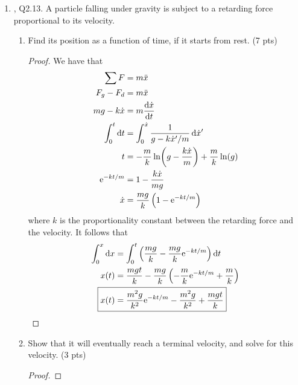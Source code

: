 \documentclass[../psets.tex]{subfiles}
\begin{document}
\begin{enumerate}
\begin{enumerate}
\begin{proof}
            \begin{align*}
                \Aboxed{x_{-a/\mu_1}(t) &= \delta x\cos(t\sqrt{\frac{2E(a\mu_2+b\mu_1)^2}{m}})-\frac{a}{\mu_1}}&
                \Aboxed{x_{b/\mu_2} &= \delta x\cos(t\sqrt{\frac{2E(a\mu_2+b\mu_1)^2}{m}})+\frac{b}{\mu_2}}
            \end{align*}
        \end{proof}
    \end{enumerate}
    \item \textcite{bib:KibbleBerkshire}, Q2.13. A particle falling under gravity is subject to a retarding force proportional to its velocity.
    \begin{enumerate}
        \item Find its position as a function of time, if it starts from rest. (7 pts)
        \begin{proof}
            We have that
            \begin{align*}
                \sum F &= m\ddot{x}\\
                F_g-F_d &= m\ddot{x}\\
                mg-k\dot{x} &= m\dv{\dot{x}}{t}\\
                \int_0^t\dd{t} &= \int_0^{\dot{x}}\frac{1}{g-k\dot{x}'/m}\dd{\dot{x}'}\\
                t &= -\frac{m}{k}\ln(g-\frac{k\dot{x}}{m})+\frac{m}{k}\ln(g)\\
                \e[-kt/m] &= 1-\frac{k\dot{x}}{mg}\\
                \dot{x} &= \frac{mg}{k}\left( 1-\e[-kt/m] \right)
            \end{align*}
            where $k$ is the proportionality constant between the retarding force and the velocity. It follows that
            \begin{align*}
                \int_0^x\dd{x} &= \int_0^t\left( \frac{mg}{k}-\frac{mg}{k}\e[-kt/m] \right)\dd{t}\\
                x(t) &= \frac{mgt}{k}-\frac{mg}{k}\left( -\frac{m}{k}\e[-kt/m]+\frac{m}{k} \right)\\
                \Aboxed{x(t) &= \frac{m^2g}{k^2}\e[-kt/m]-\frac{m^2g}{k^2}+\frac{mgt}{k}}
            \end{align*}
        \end{proof}
        \item Show that it will eventually reach a terminal velocity, and solve for this velocity. (3 pts)
        \begin{proof}

\end{proof}
\end{enumerate}
\end{enumerate}
\end{document}
